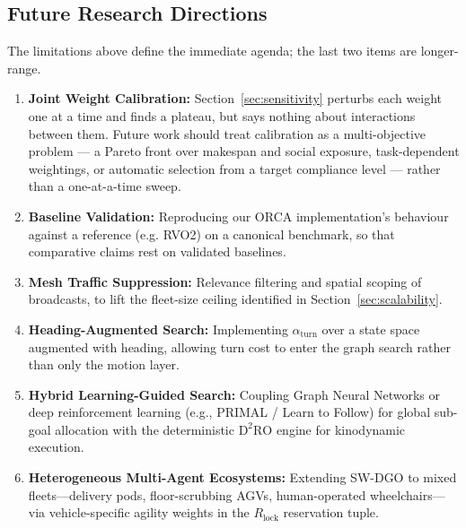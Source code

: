 \documentclass[journal]{IEEEtran}
\begin{document}
\subsection{Future Research Directions}
\label{sec:future}
The limitations above define the immediate agenda; the last two items are longer-range.
\begin{enumerate}
    \item \textbf{Joint Weight Calibration:} Section~\ref{sec:sensitivity} perturbs each weight one at a time and finds a plateau, but says nothing about interactions between them. Future work should treat calibration as a multi-objective problem --- a Pareto front over makespan and social exposure, task-dependent weightings, or automatic selection from a target compliance level --- rather than a one-at-a-time sweep.
    \item \textbf{Baseline Validation:} Reproducing our ORCA implementation's behaviour against a reference (e.g. RVO2) on a canonical benchmark, so that comparative claims rest on validated baselines.
    \item \textbf{Mesh Traffic Suppression:} Relevance filtering and spatial scoping of broadcasts, to lift the fleet-size ceiling identified in Section~\ref{sec:scalability}.
    \item \textbf{Heading-Augmented Search:} Implementing $\alpha_{\text{turn}}$ over a state space augmented with heading, allowing turn cost to enter the graph search rather than only the motion layer.
    \item \textbf{Hybrid Learning-Guided Search:} Coupling Graph Neural Networks or deep reinforcement learning (e.g., PRIMAL / Learn to Follow) for global sub-goal allocation with the deterministic $\text{D}^2\text{RO}$ engine for kinodynamic execution.
    \item \textbf{Heterogeneous Multi-Agent Ecosystems:} Extending SW-DGO to mixed fleets---delivery pods, floor-scrubbing AGVs, human-operated wheelchairs---via vehicle-specific agility weights in the $R_{\text{lock}}$ reservation tuple.
\end{enumerate}
\end{document}
